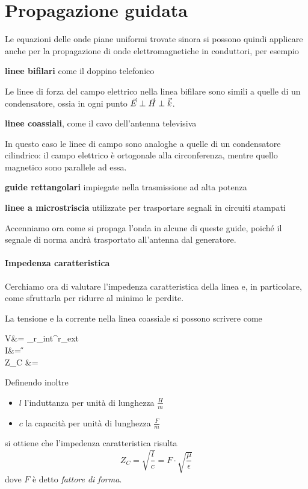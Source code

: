 \section{Propagazione guidata}
Le equazioni delle onde piane uniformi trovate sinora si possono quindi applicare anche per la propagazione di onde elettromagnetiche in conduttori, per esempio
\begin{description}
	\item \textbf{linee bifilari} come il doppino telefonico

	Le linee di forza del campo elettrico nella linea bifilare sono simili a quelle di un condensatore, ossia in ogni punto $\vec{E}\perp\vec{H}\perp\vec{k}$.

	\item \textbf{linee coassiali}, come il cavo dell'antenna televisiva

	In questo caso le linee di campo sono analoghe a quelle di un condensatore cilindrico: il campo elettrico è ortogonale alla circonferenza, mentre quello magnetico sono parallele ad essa.

	\item \textbf{guide rettangolari} impiegate nella trasmissione ad alta potenza

	\item \textbf{linee a microstriscia} utilizzate per trasportare segnali in circuiti stampati
\end{description}
Accenniamo ora come si propaga l'onda in alcune di queste guide, poiché il segnale di norma andrà trasportato all'antenna dal generatore.

\paragraph{Impedenza caratteristica}
Cerchiamo ora di valutare l'impedenza caratteristica della linea e, in particolare, come sfruttarla per ridurre al minimo le perdite.

La tensione e la corrente nella linea coassiale si possono scrivere come
\begin{esp}
	V&= \int_{r_{int}}^{r_{ext}} \E \cdot \de {} \\
	I&= \oint \H \cdot \de {} \\
	\implies Z_C &=  
\end{esp}
Definendo inoltre
\begin{itemize}
	\item $l$ l'induttanza per unità di lunghezza $\frac{H}{m}$
	\item $c$ la capacità per unità di lunghezza $\frac{F}{m}$
\end{itemize}
si ottiene che l'impedenza caratteristica risulta
\begin{equation}
	Z_C = \sqrt{\frac{l}{c}} = F \cdot \sqrt{\frac{\mu}{\epsilon}}
\end{equation}
dove $F$ è detto \emph{fattore di forma}.

